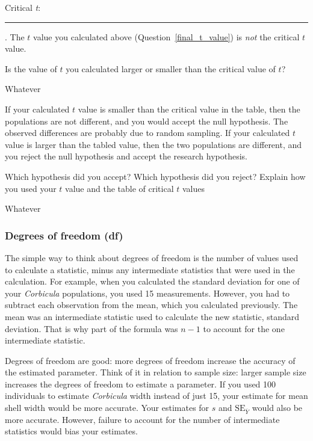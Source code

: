 \documentclass[12pt]{exam}
\newcommand*\AnswerBox[2]{%
    \parbox[t][#1]{0.92\textwidth}{%
    \begin{solution}#2\end{solution}}
}
\newcommand*\meansubY{\overline{Y}}
\newcommand*\Corbicula{\textit{Corbicula}}
\newcommand*\AnswerBlank{\rule{0.75in}{0.4pt}\kern0.67pt.}
\begin{document}
\begin{questions}
Critical \textit{t}: \AnswerBlank{}  The $t$ value you calculated above (Question~\ref{final_t_value}) is \emph{not} the critical $t$ value.

\bigskip

\question
Is the value of $t$ you calculated larger or smaller than the critical value of $t$?

\AnswerBox{2\baselineskip}{Whatever}

If your calculated $t$ value is smaller than the critical value in the table, then the populations are not different, and you would accept the null hypothesis. The observed differences are probably due to random sampling. If your calculated $t$ value is larger than the tabled value, then the two populations are different, and you reject the null hypothesis and accept the research hypothesis.


\question
Which hypothesis did you accept? Which hypothesis did you reject? Explain how you used your $t$ value and the table of critical $t$ values 

\AnswerBox{6\baselineskip}{Whatever}




\end{questions}



\subsubsection*{Degrees of freedom (df)}\label{degrees_freedom}

The simple way to think about degrees of freedom is the number of values used to calculate a statistic, minus any intermediate statistics that were used in the calculation. For example, when you calculated the standard deviation for one of your \Corbicula{} populations, you used 15 measurements. However, you had to subtract each observation from the mean, which you calculated previously. The mean was an intermediate statistic used to calculate the new statistic, standard deviation. That is why part of the formula was $n-1$ to account for the one intermediate statistic. 

Degrees of freedom are good: more degrees of freedom increase the accuracy of the estimated parameter. Think of it in relation to sample size: larger sample size increases the degrees of freedom to estimate a parameter. If you used 100 individuals to estimate \Corbicula{} width instead of just 15, your estimate for mean shell width would be more accurate. Your estimates for $s$ and $\mathrm{SE}_{\meansubY}$ would also be more accurate. However, failure to account for the number of intermediate statistics would bias your estimates.
\end{document}
